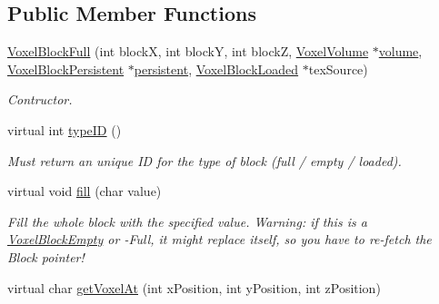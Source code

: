 \subsection*{\-Public \-Member \-Functions}
\begin{DoxyCompactItemize}
\item 
\hypertarget{classVoxelBlockFull_afe438d093d0d2e6f38ce26684bdec51f}{
\hyperlink{classVoxelBlockFull_afe438d093d0d2e6f38ce26684bdec51f}{\-Voxel\-Block\-Full} (int block\-X, int block\-Y, int block\-Z, \hyperlink{classVoxelVolume}{\-Voxel\-Volume} $\ast$\hyperlink{classVoxelBlock_aa8398251c9d5d3ba466e8993bcb6eb38}{volume}, \hyperlink{classVoxelBlockPersistent}{\-Voxel\-Block\-Persistent} $\ast$\hyperlink{classVoxelBlock_ad9d2e2c26398379b6a92e2e5ea4ab20d}{persistent}, \hyperlink{classVoxelBlockLoaded}{\-Voxel\-Block\-Loaded} $\ast$tex\-Source)}
\label{db/d9c/classVoxelBlockFull_afe438d093d0d2e6f38ce26684bdec51f}

\begin{DoxyCompactList}\small\item\em \-Contructor. \end{DoxyCompactList}\item 
\hypertarget{classVoxelBlockFull_a8a93e41ffec00b781091207eb715db1c}{
virtual int \hyperlink{classVoxelBlockFull_a8a93e41ffec00b781091207eb715db1c}{type\-I\-D} ()}
\label{db/d9c/classVoxelBlockFull_a8a93e41ffec00b781091207eb715db1c}

\begin{DoxyCompactList}\small\item\em \-Must return an unique \-I\-D for the type of block (full / empty / loaded). \end{DoxyCompactList}\item 
\hypertarget{classVoxelBlockFull_a24ef76d34bb237bc2583ab69eb4a2626}{
virtual void \hyperlink{classVoxelBlockFull_a24ef76d34bb237bc2583ab69eb4a2626}{fill} (char value)}
\label{db/d9c/classVoxelBlockFull_a24ef76d34bb237bc2583ab69eb4a2626}

\begin{DoxyCompactList}\small\item\em \-Fill the whole block with the specified value. \-Warning\-: if this is a \hyperlink{classVoxelBlockEmpty}{\-Voxel\-Block\-Empty} or -\/\-Full, it might replace itself, so you have to re-\/fetch the \-Block pointer! \end{DoxyCompactList}\item 
\hypertarget{classVoxelBlockFull_aabff921367827bea0bd83f6e4208c7da}{
virtual char \hyperlink{classVoxelBlockFull_aabff921367827bea0bd83f6e4208c7da}{get\-Voxel\-At} (int x\-Position, int y\-Position, int z\-Position)}
\label{db/d9c/classVoxelBlockFull_aabff921367827bea0bd83f6e4208c7da}


\end{DoxyCompactItemize}
